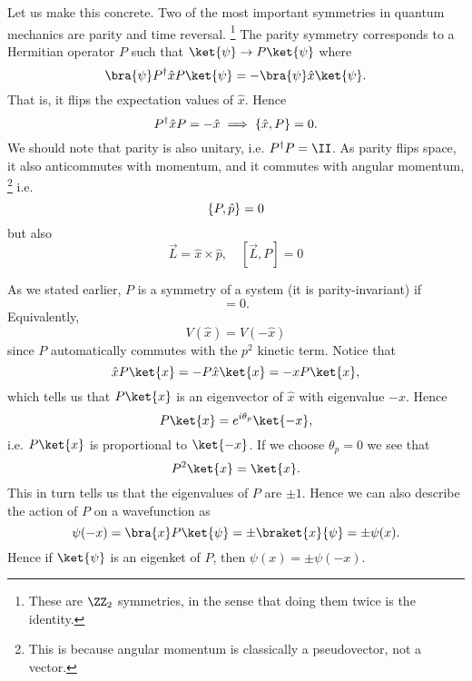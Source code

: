 Let us make this concrete. Two of the most important symmetries in quantum mechanics are parity and time reversal.%
    \footnote{These are $\ZZ_2$ symmetries, in the sense that doing them twice is the identity.}
The parity symmetry corresponds to a Hermitian operator $P$ such that $\ket{\psi} \to P \ket{\psi}$ where
\begin{equation}
    \bra{\psi} P^\dagger \hat x P \ket{\psi} = -\bra{\psi} \hat x \ket{\psi}.
\end{equation}
That is, it flips the expectation values of $\hat x$. Hence
\begin{equation}
    P^\dagger \hat x P = -\hat x \implies \{\hat x, P\}=0.
\end{equation}
We should note that parity is also unitary, i.e. $P^\dagger P=\II$. As parity flips space, it also anticommutes with momentum, and it commutes with angular momentum,%
    \footnote{This is because angular momentum is classically a pseudovector, not a vector.}
i.e.
\begin{equation}
    \{P,\hat p\} =0
\end{equation}
but also
\begin{equation}
    \vec L = \hat x \times \hat p, \quad [\vec L, P]=0
\end{equation}

As we stated earlier, $P$ is a symmetry of a system (it is parity-invariant) if
\begin{equation}
    [\hat H, P]=0.
\end{equation}
Equivalently,
\begin{equation}
    V(\hat x) = V(-\hat x)
\end{equation}
since $P$ automatically commutes with the $p^2$ kinetic term. Notice that
\begin{equation}
    \hat x P\ket{x} = -P \hat x \ket{x} = -x P \ket{x},
\end{equation}
which tells us that $P\ket{x}$ is an eigenvector of $\hat x$ with eigenvalue $-x$. Hence
\begin{equation}
    P\ket{x} = e^{i\theta_p} \ket{-x},
\end{equation}
i.e. $P\ket{x}$ is proportional to $\ket{-x}$. If we choose $\theta_p=0$ we see that
\begin{equation}
    P^2 \ket{x} = \ket{x}.
\end{equation}
This in turn tells us that the eigenvalues of $P$ are $\pm 1$.
Hence we can also describe the action of $P$ on a wavefunction as
\begin{equation}
    \psi(-x) = \bra{x} P \ket{\psi} = \pm \braket{x}{\psi} = \pm \psi(x).
\end{equation}
Hence if $\ket{\psi}$ is an eigenket of $P$, then $\psi(x) = \pm \psi(-x)$.

